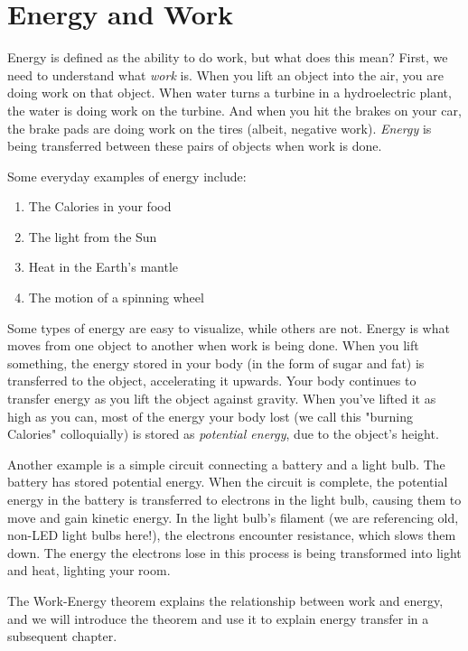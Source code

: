 \section{Energy and Work}

Energy is defined as the ability to do work, but what does this mean? First, we 
need to understand what \textit{work} is. When you lift an object into the air, 
you are doing work on that object. When water turns a turbine in a hydroelectric 
plant, the water is doing work on the turbine. And when you hit the brakes on your
car, the brake pads are doing work on the tires (albeit, negative work). 
\textit{Energy} is being transferred between these pairs of objects when work is 
done. 

Some everyday examples of energy include:
\begin{enumerate}
\item The Calories in your food
\item The light from the Sun
\item Heat in the Earth's mantle
\item The motion of a spinning wheel
\end{enumerate}

Some types of energy are easy to visualize, while others are not. Energy is what 
moves from one object to another when work is being done. When you lift 
something, the energy stored in your body (in the form of sugar and fat) is 
transferred to the object, accelerating it upwards. Your body continues to 
transfer energy as you lift the object against gravity. When you've lifted it as 
high as you can, most of the energy your body lost (we call this "burning 
Calories" colloquially) is stored as \textit{potential energy}, due to the 
object's height. 

Another example is a simple circuit connecting a battery and a light bulb. The 
battery has stored potential energy. When the circuit is complete, the potential 
energy in the battery is transferred to electrons in the light bulb, causing them 
to move and gain kinetic energy. In the light bulb's filament (we are referencing 
old, non-LED light bulbs here!), the electrons encounter resistance, which slows 
them down. The energy the electrons lose in this process is being transformed into 
light and heat, lighting your room. 

The Work-Energy theorem explains the relationship between work and energy, and we 
will introduce the theorem and use it to explain energy transfer in a subsequent 
chapter. 


